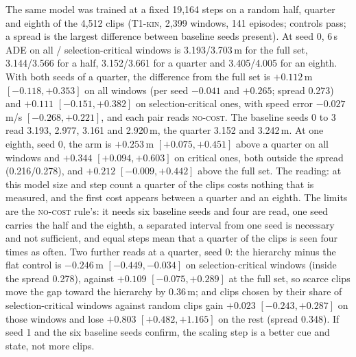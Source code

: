 \documentclass[10pt,twocolumn]{article}
\makeatletter
\theoremstyle{remark}
\newcommand{\tier}[1]{\textsc{\small #1}}
\renewcommand\paragraph{\@startsection{paragraph}{4}{\z@}{1.6ex \@plus .5ex \@minus .2ex}{-1em}{\normalfont\normalsize\bfseries}}
\makeatother
\begin{document}
\paragraph{Data efficiency (preliminary).} The same model was trained at a fixed 19,164 steps on a random half, quarter and eighth
of the 4,512 clips (\tier{T1-kin}, 2,399 windows, 141 episodes; controls pass; a spread is the largest difference between baseline
seeds present). At seed 0, 6\,s ADE on all / selection-critical windows is 3.193/3.703\,m for the full set, 3.144/3.566 for a half,
3.152/3.661 for a quarter and 3.405/4.005 for an eighth. With both seeds of a quarter, the difference from the full set is $+0.112$\,m
$[-0.118,+0.353]$ on all windows (per seed $-0.041$ and $+0.265$; spread 0.273) and $+0.111$ $[-0.151,+0.382]$ on selection-critical
ones, with speed error $-0.027$\,m/s $[-0.268,+0.221]$, and each pair reads \textsc{no-cost}. The baseline seeds 0 to 3 read 3.193,
2.977, 3.161 and 2.920\,m, the quarter 3.152 and 3.242\,m. At one eighth, seed 0, the arm is $+0.253$\,m $[+0.075,+0.451]$ above a
quarter on all windows and $+0.344$ $[+0.094,+0.603]$ on critical ones, both outside the spread (0.216/0.278), and $+0.212$
$[-0.009,+0.442]$ above the full set. The reading: at this model size and step count a quarter of the clips costs nothing that is
measured, and the first cost appears between a quarter and an eighth. The limits are the \textsc{no-cost} rule's: it needs six
baseline seeds and four are read, one seed carries the half and the eighth, a separated interval from one seed is necessary and not
sufficient, and equal steps mean that a quarter of the clips is seen four times as often. Two further reads at a quarter, seed 0:
the hierarchy minus the flat control is $-0.246$\,m $[-0.449,-0.034]$ on selection-critical windows (inside the spread 0.278),
against $+0.109$ $[-0.075,+0.289]$ at the full set, so scarce clips move the gap toward the hierarchy by 0.36\,m; and clips chosen
by their share of selection-critical windows against random clips gain $+0.023$ $[-0.243,+0.287]$ on those windows and lose
$+0.803$ $[+0.482,+1.165]$ on the rest (spread 0.348). If seed 1 and the six baseline seeds confirm, the scaling step is a better
cue and state, not more clips.
\end{document}
